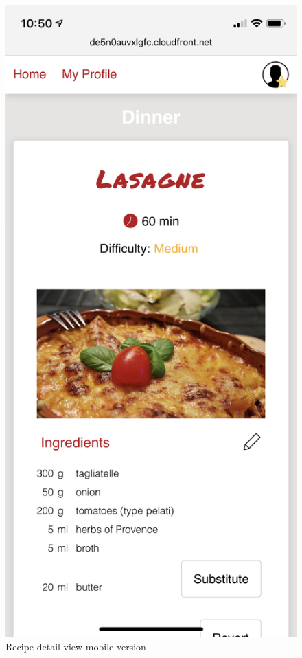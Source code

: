 \vspace{-2em}
\begin{figure}[H]
	\captionsetup{justification=centering}
	\begin{center}
		\includegraphics[scale=0.25]{Ressourcen/img/screenshots/iphoneC.png}
		\vspace{-3em}
		\caption{Recipe detail view mobile version}
	\end{center}
\end{figure}


